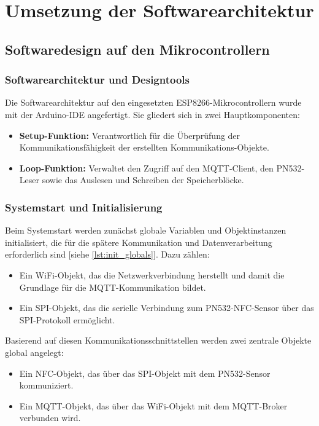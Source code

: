 \chapter{Umsetzung der Softwarearchitektur}
\label{cha:umsetzung}
\section{Softwaredesign auf den Mikrocontrollern}
\label{sec:Node-MCU}

\subsection{Softwarearchitektur und Designtools}

Die Softwarearchitektur auf den eingesetzten ESP8266-Mikrocontrollern wurde mit der Arduino-IDE angefertigt. Sie gliedert sich in zwei Hauptkomponenten:

\begin{itemize}
	\item \textbf{Setup-Funktion:} Verantwortlich für die Überprüfung der Kommunikationsfähigkeit der erstellten Kommunikations-Objekte.
	\item \textbf{Loop-Funktion:} Verwaltet den Zugriff auf den MQTT-Client, den PN532-Leser sowie das Auslesen und Schreiben der Speicherblöcke.
\end{itemize}


\subsection{Systemstart und Initialisierung}

Beim Systemstart werden zunächst globale Variablen und Objektinstanzen initialisiert, die für die spätere Kommunikation und Datenverarbeitung erforderlich sind [siehe \autoref{lst:init_globals}]. Dazu zählen:

\begin{itemize}
	\item Ein WiFi-Objekt, das die Netzwerkverbindung herstellt und damit die Grundlage für die MQTT-Kommunikation bildet.
	\item Ein SPI-Objekt, das die serielle Verbindung zum PN532-NFC-Sensor über das SPI-Protokoll ermöglicht.
\end{itemize}

Basierend auf diesen Kommunikationsschnittstellen werden zwei zentrale Objekte global angelegt:

\begin{itemize}
	\item Ein NFC-Objekt, das über das SPI-Objekt mit dem PN532-Sensor kommuniziert.
	\item Ein MQTT-Objekt, das über das WiFi-Objekt mit dem MQTT-Broker verbunden wird.
\end{itemize}

